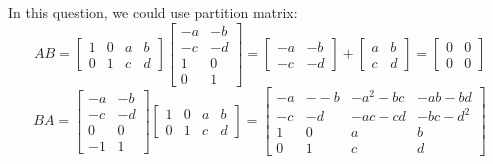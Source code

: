 \documentclass[11pt]{homework}
\begin{document}
    \question
    In this question, we could use partition matrix:
    \begin{equation}
        AB=
        \left[\begin{array}{cc|cc}
        1 & 0 & a & b \\ 
        0 & 1 & c & d
        \end{array}\right]
        \left[\begin{array}{cc}
        -a & -b \\ 
        -c & -d \\ 
        \hline
        1 & 0 \\ 
        0 & 1
        \end{array}\right]=
        \left[\begin{array}{cc}
        -a & -b \\ 
        -c & -d
        \end{array}\right]+
        \left[\begin{array}{cc}
        a & b \\ 
        c & d
        \end{array}\right]=
        \left[\begin{array}{cc}
        0 & 0 \\ 
        0 & 0
        \end{array}\right]
    \end{equation}
    \begin{equation}
        BA=
        \left[\begin{array}{cc}
        -a & -b \\ 
        -c & -d \\ 
        \hline
        0 & 0 \\ 
        -1 & 1
        \end{array}\right]
        \left[\begin{array}{cc|cc}
        1 & 0 & a & b \\ 
        0 & 1 & c & d
        \end{array}\right]=
        \left[\begin{array}{cccc}
        -a & --b & -a^2-bc & -ab-bd \\ 
        -c & -d & -ac-cd & -bc-d^2 \\ 
        1 & 0 & a & b \\ 
        0 & 1 & c & d
        \end{array}\right]
    \end{equation}
    
\end{document}
